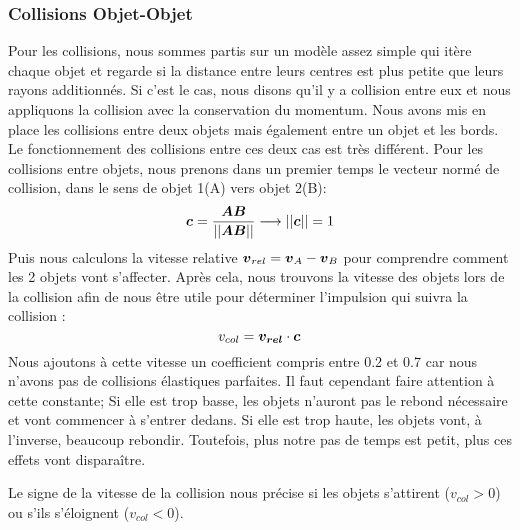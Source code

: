         \subsubsection{Collisions Objet-Objet}
            Pour les collisions, nous sommes partis sur un modèle assez simple qui itère chaque objet et regarde si la distance entre leurs centres est plus petite que leurs rayons additionnés. Si c'est le cas, nous disons qu'il y a collision entre eux et nous appliquons la collision avec la conservation du momentum. 
            Nous avons mis en place les collisions entre deux objets mais également entre un objet et les bords. Le fonctionnement des collisions entre ces deux cas est très différent. Pour les collisions entre objets, nous prenons dans un premier temps le vecteur normé de collision, dans le sens de objet 1(A) vers objet 2(B):
            \begin{equation}
                \vb*{c} = \frac{\vb*{AB}}{||\vb*{AB}||} \longrightarrow ||\vb*{c}|| = 1
            \end{equation}
            Puis nous calculons la vitesse relative $\vb*{v}_{rel} = \vb*{v}_A - \vb*{v}_B$ pour comprendre comment les 2 objets vont s'affecter. Après cela, nous trouvons la vitesse des objets lors de la collision afin de nous être utile pour déterminer l'impulsion qui suivra la collision :
            \begin{equation}
                v_{col}=\vb*{v_{rel}}\cdot\vb*{c}
            \end{equation}
            Nous ajoutons à cette vitesse un coefficient compris entre 0.2 et 0.7 car nous n'avons pas de collisions élastiques parfaites. Il faut cependant faire attention à cette constante; Si elle est trop basse, les objets n'auront pas le rebond nécessaire et vont commencer à s'entrer dedans. Si elle est trop haute, les objets vont, à l'inverse, beaucoup rebondir. Toutefois, plus notre pas de temps est petit, plus ces effets vont disparaître.
            
            Le signe de la vitesse de la collision nous précise si les objets s'attirent ($v_{col} > 0$) ou s'ils s'éloignent ($v_{col} < 0$).
            

